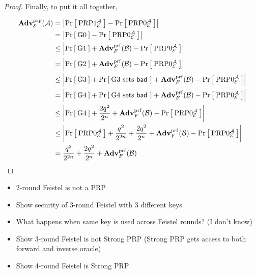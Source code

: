 \begin{proof}
Finally, to put it all together,

\begin{align*}
\AdvPRP{\Feistel}{\advA}
    &=\left|\Prob{\PRP1^\advA_\Feistel} - \Prob{\PRP0^\advA_\Feistel}\right|\\
    &= \left|\Prob{\G0} - \Prob{\PRP0^\advA_\cipher}\right|\\
    &\le \left|\Prob{\G1} + \AdvPRF{F}{\advB} - \Prob{\PRP0^\advA_\cipher}\right|\\
    &=   \left|\Prob{\G2} + \AdvPRF{F}{\advB} - \Prob{\PRP0^\advA_\cipher}\right|\\
    &\le \left|\Prob{\G3} + \Prob{\G3\setsbad} + \AdvPRF{F}{\advB} - \Prob{\PRP0^\advA_\cipher}\right|\\
    &= \left|\Prob{\G4} + \Prob{\G4\setsbad} + \AdvPRF{F}{\advB} - \Prob{\PRP0^\advA_\cipher}\right|\\
    &\le \left|\Prob{\G4} + \frac{2q^2}{2^n} + \AdvPRF{F}{\advB} - \Prob{\PRP0^\advA_\cipher}\right|\\
    &\le \left|\Prob{\PRP0^\advA_\cipher} + \frac{q^2}{2^{2n}} + \frac{2q^2}{2^n} + \AdvPRF{F}{\advB} - \Prob{\PRP0^\advA_\cipher}\right|\\
    &= \frac{q^2}{2^{2n}} + \frac{2q^2}{2^n} + \AdvPRF{F}{\advB}\\
\end{align*}

\end{proof}

\begin{itemize}
  \item 2-round Feistel is not a PRP
  \item Show security of 3-round Feistel with 3 different keys
  \item What happens when same key is used across Feistel rounds? (I don't know)
  \item Show 3-round Feistel is not Strong PRP (Strong PRP gets access to both forward and inverse oracle) 
  \item Show 4-round Feistel is Strong PRP
\end{itemize}
